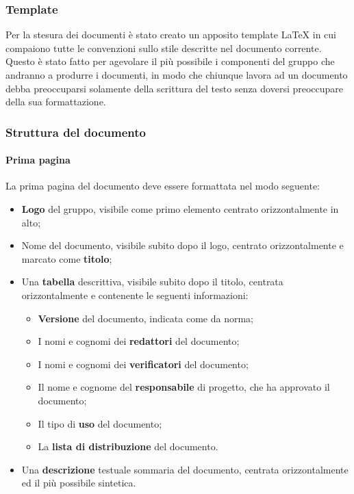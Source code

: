 \subsubsection{Template}

Per la stesura dei documenti è stato creato un apposito template \LaTeX{} in cui compaiono tutte le convenzioni sullo stile descritte nel documento corrente. Questo è stato fatto per agevolare il più possibile i componenti del gruppo che andranno a produrre i documenti, in modo che chiunque lavora ad un documento debba preoccuparsi solamente della scrittura del testo senza doversi preoccupare della sua formattazione. 

\subsubsection{Struttura del documento}

	\paragraph{Prima pagina}
	
	La prima pagina del documento deve essere formattata nel modo seguente:
	
	\begin{itemize}
	
		\item \textbf{Logo} del gruppo, visibile come primo elemento centrato orizzontalmente in alto;
		\item Nome del documento, visibile subito dopo il logo, centrato orizzontalmente e marcato come \textbf{titolo};
		\item Una \textbf{tabella} descrittiva, visibile subito dopo il titolo, centrata orizzontalmente e contenente le seguenti informazioni:
			\begin{itemize}
			
				\item \textbf{Versione} del documento, indicata come da norma;
				\item I nomi e cognomi dei \textbf{redattori} del documento;
				\item I nomi e cognomi dei \textbf{verificatori} del documento;
				\item Il nome e cognome del \textbf{responsabile} di progetto, che ha approvato il documento;
				\item Il tipo di \textbf{uso} del documento;
				\item La \textbf{lista di distribuzione} del documento.
			
			\end{itemize}
		\item Una \textbf{descrizione} testuale sommaria del documento, centrata orizzontalmente ed il più possibile sintetica.
	
	\end{itemize}
	
